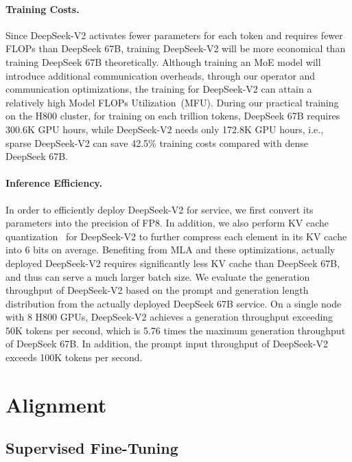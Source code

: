 \paragraph{Training Costs.} Since DeepSeek-V2 activates fewer parameters for each token and requires fewer FLOPs than DeepSeek 67B, training DeepSeek-V2 will be more economical than training DeepSeek 67B theoretically. Although training an MoE model will introduce additional communication overheads, through our operator and communication optimizations, the training for DeepSeek-V2 can attain a relatively high Model FLOPs Utilization~(MFU). During our practical training on the H800 cluster, for training on each trillion tokens, DeepSeek 67B requires 300.6K GPU hours, while DeepSeek-V2 needs only 172.8K GPU hours, i.e., sparse DeepSeek-V2 can save 42.5\% training costs compared with dense DeepSeek 67B. 

\paragraph{Inference Efficiency.} In order to efficiently deploy DeepSeek-V2 for service, we first convert its parameters into the precision of FP8. In addition, we also perform KV cache quantization~\citep{kv_quant,atom} for DeepSeek-V2 to further compress each element in its KV cache into 6 bits on average. Benefiting from MLA and these optimizations, actually deployed DeepSeek-V2 requires significantly less KV cache than DeepSeek 67B, and thus can serve a much larger batch size. We evaluate the generation throughput of DeepSeek-V2 based on the prompt and generation length distribution from the actually deployed DeepSeek 67B service. On a single node with 8 H800 GPUs, DeepSeek-V2 achieves a generation throughput exceeding 50K tokens per second, which is 5.76 times the maximum generation throughput of DeepSeek 67B. In addition, the prompt input throughput of DeepSeek-V2 exceeds 100K tokens per second. 

\section{Alignment}
\label{sec:alignment}

\subsection{Supervised Fine-Tuning}

